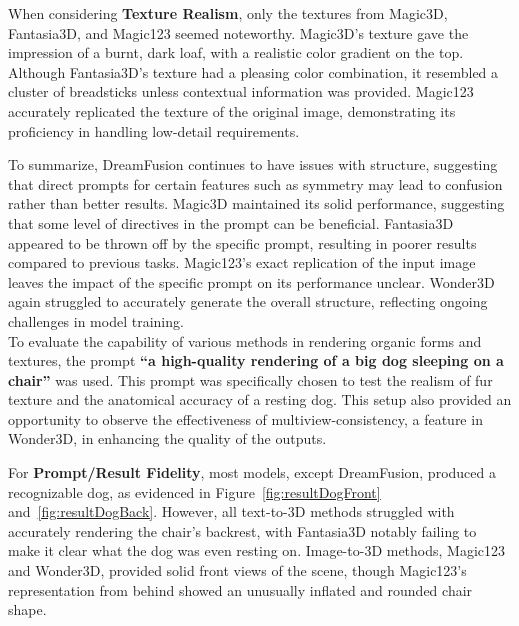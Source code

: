 When considering \textbf{Texture Realism}, only the textures from Magic3D, Fantasia3D, and Magic123 seemed noteworthy. Magic3D's texture gave the impression of a burnt, dark loaf, with a realistic color gradient on the top. Although Fantasia3D's texture had a pleasing color combination, it resembled a cluster of breadsticks unless contextual information was provided. Magic123 accurately replicated the texture of the original image, demonstrating its proficiency in handling low-detail requirements.

To summarize, DreamFusion continues to have issues with structure, suggesting that direct prompts for certain features such as symmetry may lead to confusion rather than better results. Magic3D maintained its solid performance, suggesting that some level of directives in the prompt can be beneficial. Fantasia3D appeared to be thrown off by the specific prompt, resulting in poorer results compared to previous tasks. Magic123's exact replication of the input image leaves the impact of the specific prompt on its performance unclear. Wonder3D again struggled to accurately generate the overall structure, reflecting ongoing challenges in model training.\\





To evaluate the capability of various methods in rendering organic forms and textures, the prompt \textbf{``a high-quality rendering of a big dog sleeping on a chair''} was used. This prompt was specifically chosen to test the realism of fur texture and the anatomical accuracy of a resting dog. This setup also provided an opportunity to observe the effectiveness of multiview-consistency, a feature in Wonder3D, in enhancing the quality of the outputs.

For \textbf{Prompt/Result Fidelity}, most models, except DreamFusion, produced a recognizable dog, as evidenced in Figure~\ref{fig:resultDogFront} and~\ref{fig:resultDogBack}. However, all text-to-3D methods struggled with accurately rendering the chair's backrest, with Fantasia3D notably failing to make it clear what the dog was even resting on. Image-to-3D methods, Magic123 and Wonder3D, provided solid front views of the scene, though Magic123's representation from behind showed an unusually inflated and rounded chair shape.

